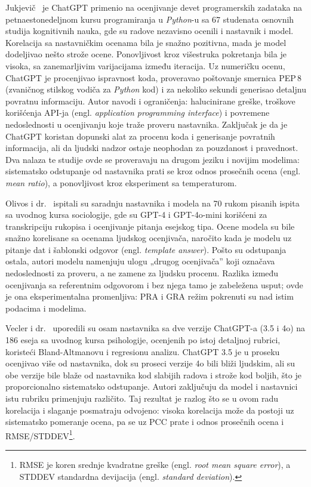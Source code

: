 Jukjevič~\cite{jukiewicz2024future} je ChatGPT primenio na ocenjivanje devet programerskih zadataka
na petnaestonedeljnom kursu programiranja u \emph{Python}-u sa 67 studenata osnovnih studija kognitivnih nauka,
gde su radove nezavisno ocenili i nastavnik i model.
Korelacija sa nastavničkim ocenama bila je snažno pozitivna, mada je model dodeljivao nešto strože ocene.
Ponovljivost kroz višestruka pokretanja bila je visoka, sa zanemarljivim varijacijama između iteracija.
Uz numeričku ocenu, ChatGPT je procenjivao ispravnost koda,
proveravao poštovanje smernica PEP\,8 (zvaničnog stilskog vodiča za \emph{Python} kod) i za nekoliko sekundi generisao detaljnu povratnu informaciju.
Autor navodi i ograničenja: halucinirane greške, troškove korišćenja API-ja (engl. \emph{application programming interface})
i povremene nedoslednosti u ocenjivanju koje traže proveru nastavnika.
Zaključak je da je ChatGPT koristan dopunski alat za procenu koda i generisanje povratnih informacija,
ali da ljudski nadzor ostaje neophodan za pouzdanost i pravednost.
Dva nalaza te studije ovde se proveravaju na drugom jeziku i novijim modelima:
sistematsko odstupanje od nastavnika prati se kroz odnos prosečnih ocena (engl. \emph{mean ratio}),
a ponovljivost kroz eksperiment sa temperaturom.

Olivos i dr.~\cite{olivos2025assessing} ispitali su saradnju nastavnika i modela na 70 rukom pisanih ispita sa uvodnog kursa sociologije,
gde su GPT-4 i GPT-4o-mini korišćeni za transkripciju rukopisa i ocenjivanje pitanja esejskog tipa.
Ocene modela su bile snažno korelisane sa ocenama ljudskog ocenjivača,
naročito kada je modelu uz pitanje dat i šablonski odgovor (engl. \emph{template answer}).
Pošto su odstupanja ostala, autori modelu namenjuju ulogu „drugog ocenjivača'' koji označava nedoslednosti za proveru,
a ne zamene za ljudsku procenu.
Razlika između ocenjivanja sa referentnim odgovorom i bez njega tamo je zabeležena usput;
ovde je ona eksperimentalna promenljiva: PRA i GRA režim pokrenuti su nad istim podacima i modelima.

Vecler i dr.~\cite{wetzler2025grading} uporedili su osam nastavnika sa dve verzije ChatGPT-a (3.5 i 4o)
na 186 eseja sa uvodnog kursa psihologije, ocenjenih po istoj detaljnoj rubrici, koristeći Bland-Altmanovu i regresionu analizu.
ChatGPT 3.5 je u proseku ocenjivao više od nastavnika, dok su proseci verzije 4o bili bliži ljudskim,
ali su obe verzije bile blaže od nastavnika kod slabijih radova i strože kod boljih, što je proporcionalno sistematsko odstupanje.
Autori zaključuju da model i nastavnici istu rubriku primenjuju različito.
Taj rezultat je razlog što se u ovom radu korelacija i slaganje posmatraju odvojeno:
visoka korelacija može da postoji uz sistematsko pomeranje ocena,
pa se uz PCC prate i odnos prosečnih ocena i RMSE/STDDEV\footnote{RMSE je koren srednje kvadratne greške (engl. \emph{root mean square error}),
a STDDEV standardna devijacija (engl. \emph{standard deviation}).}.


